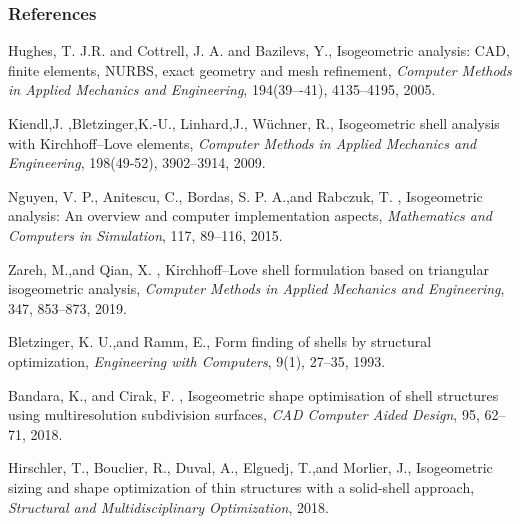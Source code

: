 %
%

\begin{frame} \frametitle{References}
\begin{thebibliography}{xx}\footnotesize
		Hughes, T. J.R. and Cottrell, J. A. and Bazilevs, Y., 
		Isogeometric analysis: CAD, finite elements, NURBS, exact geometry and mesh refinement, 
		\textit{Computer Methods in Applied Mechanics and Engineering}, 194(39–-41),  4135--4195, 2005.
		
		Kiendl,J. ,Bletzinger,K.-U., Linhard,J., Wüchner, R.,
		Isogeometric shell analysis with Kirchhoff–Love elements, 
		\textit{Computer Methods in Applied Mechanics and Engineering}, 198(49-52), 3902--3914, 2009.
		
		Nguyen, V. P., Anitescu, C., Bordas, S. P. A.,and Rabczuk, T. , 
		Isogeometric analysis: An overview and computer implementation aspects, 
		\textit{Mathematics and Computers in Simulation}, 117, 89--116, 2015.

		Zareh, M.,and Qian, X. , 
		Kirchhoff–Love shell formulation based on triangular isogeometric analysis, 
		\textit{Computer Methods in Applied Mechanics and Engineering}, 347, 853--873, 2019.

		Bletzinger, K. U.,and Ramm, E., 
		Form finding of shells by structural optimization, 
		\textit{Engineering with Computers}, 9(1), 27--35, 1993.

		Bandara, K., and Cirak, F. , 
		Isogeometric shape optimisation of shell structures using multiresolution subdivision surfaces, 
		\textit{CAD Computer Aided Design}, 95, 62--71, 2018.

		Hirschler, T., Bouclier, R., Duval, A., Elguedj, T.,and Morlier, J.,
		Isogeometric sizing and shape optimization of thin structures with a solid-shell approach, 
		\textit{Structural and Multidisciplinary Optimization}, 2018.
\end{thebibliography}
\end{frame}